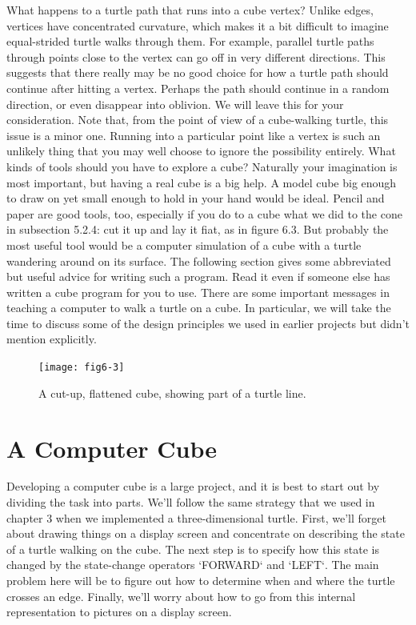 \documentclass{book}
\begin{document}
What happens to a turtle path that runs into a cube vertex? Unlike
edges, vertices have concentrated curvature, which makes it a bit difficult
to imagine equal-strided turtle walks through them. For example, parallel turtle paths through points close to the vertex can go off in very
different directions. This suggests that there really may be no good
choice for how a turtle path should continue after hitting a vertex.
Perhaps the path should continue in a random direction, or even disappear into oblivion. We will leave this for your consideration. Note that,
from the point of view of a cube-walking turtle, this issue is a minor
one. Running into a particular point like a vertex is such an unlikely
thing that you may well choose to ignore the possibility entirely.
What kinds of tools should you have to explore a cube? Naturally your
imagination is most important, but having a real cube is a big help. A
model cube big enough to draw on yet small enough to hold in your hand
would be ideal. Pencil and paper are good tools, too, especially if you
do to a cube what we did to the cone in subsection 5.2.4: cut it up and
lay it fiat, as in figure 6.3. But probably the most useful tool would be
a computer simulation of a cube with a turtle wandering around on its
surface. The following section gives some abbreviated but useful advice
for writing such a program. Read it even if someone else has written
a cube program for you to use. There are some important messages in
teaching a computer to walk a turtle on a cube. In particular, we will
take the time to discuss some of the design principles we used in earlier
projects but didn't mention explicitly.

\begin{figure}
\begin{center}
\texttt{[image: fig6-3]}
\caption{A cut-up, flattened cube, showing part of a turtle line.}
\end{center}
\end{figure}

\section{A Computer Cube}

Developing a computer cube is a large project, and it is best to start
out by dividing the task into parts. We'll follow the same strategy
that we used in chapter 3 when we implemented a three-dimensional
turtle. First, we'll forget about drawing things on a display screen and
concentrate on describing the state of a turtle walking on the cube. The
next step is to specify how this state is changed by the state-change
operators \textsc{`FORWARD`} and \textsc{`LEFT`}. The main problem here will be to figure
out how to determine when and where the turtle crosses an edge. Finally,
we'll worry about how to go from this internal representation to pictures
on a display screen.
\end{document}
